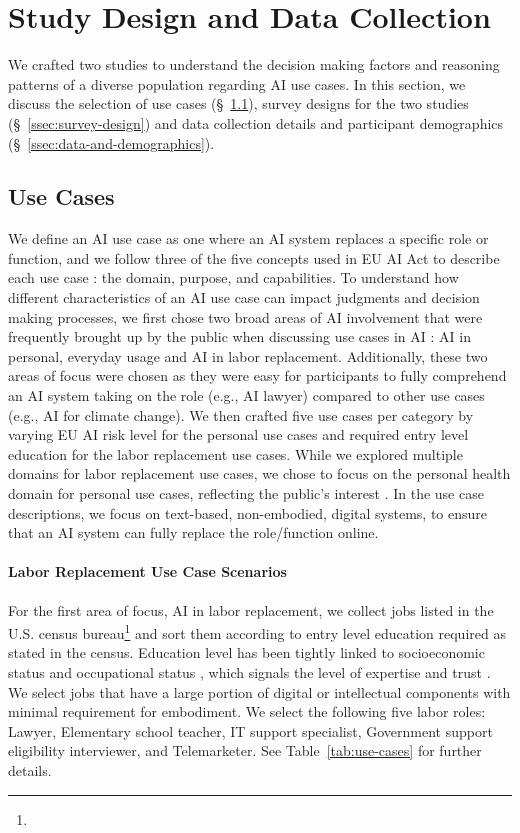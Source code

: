 \section{Study Design and Data Collection}
\label{sec:study-design}
We crafted two studies to understand the decision making factors and reasoning patterns of a diverse population regarding AI use cases. In this section, we discuss the selection of use cases (\S~\ref{ssec:use-cases}), survey designs for the two studies (\S~\ref{ssec:survey-design}) and data collection details and participant demographics (\S~\ref{ssec:data-and-demographics}).


\subsection{Use Cases}
\label{ssec:use-cases}
We define an AI use case as one where an AI system replaces a specific role or function, and we follow three of the five concepts used in EU AI Act to describe each use case \citep{golpayegani2023risk}: the domain, purpose, and capabilities. To understand how different characteristics of an AI use case can impact judgments and decision making processes, we first chose two broad areas of AI involvement that were frequently brought up by the public when discussing use cases in AI \citep{kieslich2024myfuture,mun2024participaidemocraticsurveyingframework}: AI in personal, everyday usage and AI in labor replacement. Additionally, these two areas of focus were chosen as they were easy for participants to fully comprehend an AI system taking on the role (e.g., AI lawyer) compared to other use cases (e.g., AI for climate change). We then crafted five use cases per category by varying EU AI risk level for the personal use cases and required entry level education for the labor replacement use cases. While we explored multiple domains for labor replacement use cases, we chose to focus on the personal health domain for personal use cases, reflecting the public's interest \citep{mun2024participaidemocraticsurveyingframework,kieslich2024myfuture}. In the use case descriptions, we focus on text-based, non-embodied, digital systems, to ensure that an AI system can fully replace the role/function online.


\paragraph{Labor Replacement Use Case Scenarios} 
For the first area of focus, AI in labor replacement, we collect jobs listed in the U.S. census bureau\footnote{} and sort them according to entry level education required as stated in the census. Education level has been tightly linked to socioeconomic status \citep{} and occupational status \citep{}, which signals the level of expertise and trust \citep{svensson2006professional,evetts2006introduction}. We select jobs that have a large portion of digital or intellectual components with minimal requirement for embodiment. We select the following five labor roles: Lawyer, Elementary school teacher, IT support specialist, Government support eligibility interviewer, and Telemarketer. See Table~\ref{tab:use-cases} for further details.

